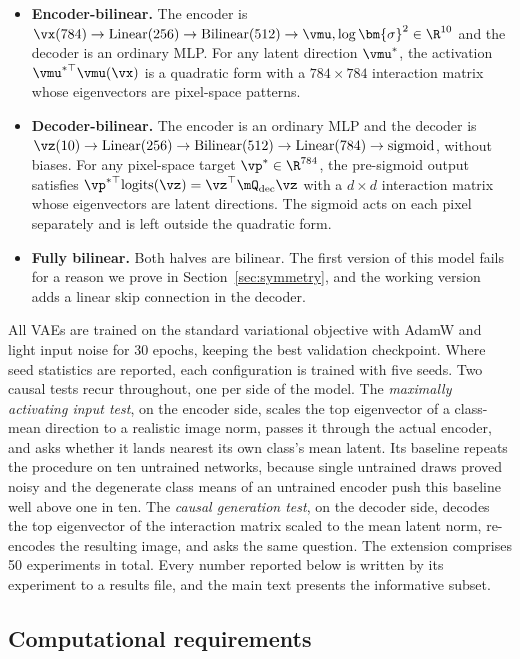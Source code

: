 \documentclass[10pt]{article} %
\def\vsigma{{\bm{\sigma}}} %
\begin{document}
\begin{itemize}
\item \textbf{Encoder-bilinear.} The encoder is $\vx(784) \to \text{Linear}(256)
  \to \text{Bilinear}(512) \to \vmu, \log\vsigma^2 \in \R^{10}$ and the decoder is
  an ordinary MLP. For any latent direction $\vmu^*$, the activation
  $\vmu^{*\top}\vmu(\vx)$ is a quadratic form with a $784 \times 784$ interaction
  matrix whose eigenvectors are pixel-space patterns.
\item \textbf{Decoder-bilinear.} The encoder is an ordinary MLP and the decoder is
  $\vz(10) \to \text{Linear}(256) \to \text{Bilinear}(512) \to \text{Linear}(784)
  \to \text{sigmoid}$, without biases. For any pixel-space target
  $\vp^* \in \R^{784}$, the pre-sigmoid output satisfies
  $\vp^{*\top}\text{logits}(\vz) = \vz^\top \mQ_{\text{dec}} \vz$ with a
  $d \times d$ interaction matrix whose eigenvectors are latent directions. The
  sigmoid acts on each pixel separately and is left outside the quadratic form.
\item \textbf{Fully bilinear.} Both halves are bilinear. The first version of this
  model fails for a reason we prove in Section~\ref{sec:symmetry}, and the working
  version adds a linear skip connection in the decoder.
\end{itemize}

All VAEs are trained on the standard variational objective with AdamW and light
input noise for 30 epochs, keeping the best validation checkpoint. Where seed
statistics are reported, each configuration is trained with five seeds. Two causal
tests recur throughout, one per side of the model. The \emph{maximally activating
input test}, on the encoder side, scales the top eigenvector of a class-mean
direction to a realistic image norm, passes it through the actual encoder, and asks
whether it lands nearest its own class's mean latent. Its baseline repeats the
procedure on ten untrained networks, because single untrained draws proved noisy
and the degenerate class means of an untrained encoder push this baseline well
above one in ten. The \emph{causal generation test}, on the decoder side, decodes
the top eigenvector of the interaction matrix scaled to the mean latent norm,
re-encodes the resulting image, and asks the same question. The extension comprises
50 experiments in total. Every number reported below is written by its experiment
to a results file, and the main text presents the informative subset.

\subsection{Computational requirements}
\label{sec:compute}
\end{document}
